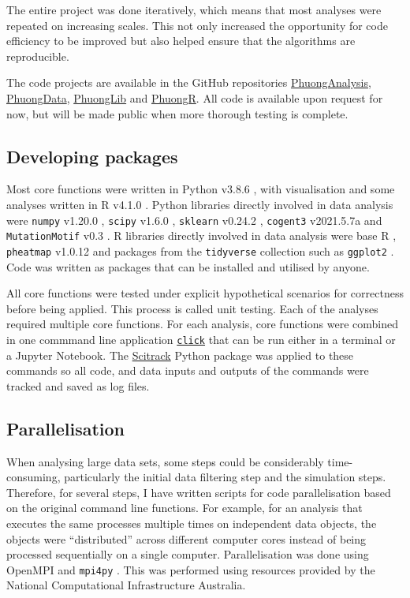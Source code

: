 The entire project was done iteratively, which means that most analyses were repeated on increasing scales. This not only increased the opportunity for code efficiency to be improved but also helped ensure that the algorithms are reproducible. 

The code projects are available in the GitHub repositories \href{https://github.com/GavinHuttley/PhuongAnalysis}{PhuongAnalysis}, \href{{https://github.com/GavinHuttley/PhuongData}}{PhuongData}, \href{https://github.com/GavinHuttley/PhuongLibrary}{PhuongLib} and \href{https://github.com/Phuong-Le/PhuongR}{PhuongR}. All code is available upon request for now, but will be made public when more thorough testing is complete. 

\subsection{Developing packages}
Most core functions were written in Python v3.8.6 \citep{van1995python}, with visualisation and some analyses written in R v4.1.0 \citep{r}. Python libraries directly involved in data analysis were \texttt{numpy} v1.20.0 \citep{harris2020array}, \texttt{scipy} v1.6.0 \citep{2020SciPy-NMeth}, \texttt{sklearn} v0.24.2 \citep{scikit-learn}, \texttt{cogent3} v2021.5.7a \citep{pycogent3} and \texttt{MutationMotif} v0.3 \citep{Zhu2017}. R libraries directly involved in data analysis were base R \citep{RCoreTeam2019R:Computing}, \texttt{pheatmap} v1.0.12 \citep{pheatmap} and packages from the \texttt{tidyverse} collection such as \texttt{ggplot2} \citep{tidyverse}. Code was written as packages that can be installed and utilised by anyone.

All core functions were tested under explicit hypothetical scenarios for correctness before being applied. This process is called unit testing. Each of the analyses required multiple core functions. For each analysis, core functions were combined in one commmand line application \texttt{\href{https://click.palletsprojects.com/en/8.0.x/}{click}} that can be run either in a terminal or a Jupyter Notebook. The \href{https://github.com/HuttleyLab/scitrack}{Scitrack} Python package was applied to these commands so all code, and  data inputs and outputs of the commands were tracked and saved as log files.

\subsection{Parallelisation}
When analysing large data sets, some steps could be considerably time-consuming, particularly the initial data filtering step and the simulation steps. Therefore, for several steps, I have written scripts for code parallelisation based on the original command line functions. For example, for an analysis that executes the same processes multiple times on independent data objects, the objects were ``distributed'' across different computer cores instead of being processed sequentially on a single computer. Parallelisation was done using OpenMPI \citep{gabriel04:_open_mpi} and \texttt{mpi4py} \citep{Dalcin2011ParallelPython}. This was performed using resources provided by the National Computational Infrastructure Australia.


